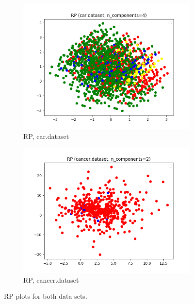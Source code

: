 \documentclass{article}
\begin{document}
\begin{figure}[htb]
        \begin{subfigure}{0.4\textwidth}
          \includegraphics[width=\linewidth]{out/rp/car-rp-comp-4.png}
          \caption{RP, car.dataset}
          \label{fig:rp-plot-car}
        \end{subfigure}\hfil
        \begin{subfigure}{0.4\textwidth}
          \includegraphics[width=\linewidth]{out/rp/cancer-rp-comp-2.png}
          \caption{RP, cancer.dataset}
          \label{fig:rp-plot-cancer}
        \end{subfigure}

      \caption{RP plots for both data sets.}
      \label{fig:rp-plot}
      \end{figure}
\end{document}
